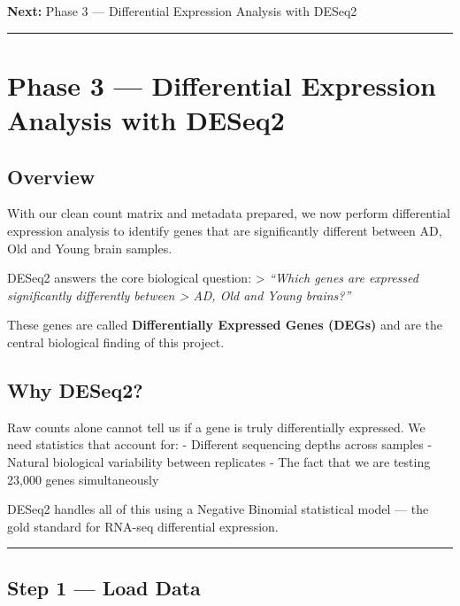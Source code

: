 \documentclass[
]{article}
\begin{document}
\textbf{Next:} Phase 3 --- Differential Expression Analysis with DESeq2

\begin{center}\rule{0.5\linewidth}{0.5pt}\end{center}

\section{Phase 3 --- Differential Expression Analysis with
DESeq2}\label{phase-3-differential-expression-analysis-with-deseq2}

\subsection{Overview}\label{overview-2}

With our clean count matrix and metadata prepared, we now perform
differential expression analysis to identify genes that are
significantly different between AD, Old and Young brain samples.

DESeq2 answers the core biological question: \textgreater{}
\emph{``Which genes are expressed significantly differently between
\textgreater{} AD, Old and Young brains?''}

These genes are called \textbf{Differentially Expressed Genes (DEGs)}
and are the central biological finding of this project.

\subsection{Why DESeq2?}\label{why-deseq2}

Raw counts alone cannot tell us if a gene is truly differentially
expressed. We need statistics that account for: - Different sequencing
depths across samples - Natural biological variability between
replicates - The fact that we are testing 23,000 genes simultaneously

DESeq2 handles all of this using a Negative Binomial statistical model
--- the gold standard for RNA-seq differential expression.

\begin{center}\rule{0.5\linewidth}{0.5pt}\end{center}

\subsection{Step 1 --- Load Data}\label{step-1-load-data}
\end{document}
